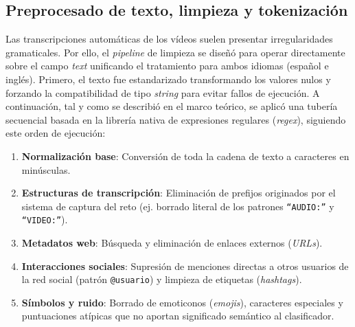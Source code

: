 \subsection{Preprocesado de texto, limpieza y tokenización}
\label{PreprocesadoDeTextoLimpiezaYTokenizacion}
Las transcripciones automáticas de los vídeos suelen presentar irregularidades gramaticales. Por ello, el \textit{pipeline} de limpieza se diseñó para operar directamente sobre el campo \textit{text} unificando el tratamiento para ambos idiomas (español e inglés). Primero, el texto fue estandarizado transformando los valores nulos y forzando la compatibilidad de tipo \textit{string} para evitar fallos de ejecución. A continuación, tal y como se describió en el marco teórico, se aplicó una tubería secuencial basada en la librería nativa de expresiones regulares (\textit{regex}), siguiendo este orden de ejecución:

\begin{enumerate}
    \item \textbf{Normalización base}: Conversión de toda la cadena de texto a caracteres en minúsculas.
    \item \textbf{Estructuras de transcripción}: Eliminación de prefijos originados por el sistema de captura del reto (ej. borrado literal de los patrones \texttt{``AUDIO:''} y \texttt{``VIDEO:''}).
    \item \textbf{Metadatos web}: Búsqueda y eliminación de enlaces externos (\textit{URLs}).
    \item \textbf{Interacciones sociales}: Supresión de menciones directas a otros usuarios de la red social (patrón \texttt{@usuario}) y limpieza de etiquetas (\textit{hashtags}).
    \item \textbf{Símbolos y ruido}: Borrado de emoticonos (\textit{emojis}), caracteres especiales y puntuaciones atípicas que no aportan significado semántico al clasificador.
\end{enumerate}

